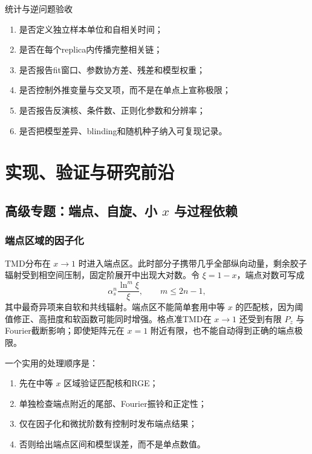 \documentclass[UTF8,12pt,a4paper,twoside,openany]{ctexbook}
\begin{document}
\begin{checkpointbox}{统计与逆问题验收}
\begin{enumerate}
  \item 是否定义独立样本单位和自相关时间；
  \item 是否在每个replica内传播完整相关链；
  \item 是否报告fit窗口、参数协方差、残差和模型权重；
  \item 是否控制外推变量与交叉项，而不是在单点上宣称极限；
  \item 是否报告反演核、条件数、正则化参数和分辨率；
  \item 是否把模型差异、blinding和随机种子纳入可复现记录。
\end{enumerate}
\end{checkpointbox}

\clearpage


\clearpage
\part{实现、验证与研究前沿}
\chapter{\texorpdfstring{高级专题：端点、自旋、小 \(x\) 与过程依赖}{高级专题：端点、自旋、小 x 与过程依赖}}
\label{sec:advanced-topics}

\section{端点区域的因子化}

TMD分布在 \(x\to1\) 时进入端点区。此时部分子携带几乎全部纵向动量，剩余胶子辐射受到相空间压制，固定阶展开中出现大对数。令 \(\xi=1-x\)，端点对数可写成
\begin{equation}
  \alpha_s^n\frac{\ln^m\xi}{\xi},
  \qquad m\le2n-1,
  \label{eq:endpoint-logs}
\end{equation}
其中最奇异项来自软和共线辐射。端点区不能简单套用中等 \(x\) 的匹配核，因为阈值修正、高扭度和软函数可能同时增强。格点准TMD在 \(x\to1\) 还受到有限 \(P_z\) 与 Fourier截断影响；即使矩阵元在 \(x=1\) 附近有限，也不能自动得到正确的端点极限。

一个实用的处理顺序是：
\begin{enumerate}
  \item 先在中等 \(x\) 区域验证匹配核和RGE；
  \item 单独检查端点附近的尾部、Fourier振铃和正定性；
  \item 仅在因子化和微扰阶数有控制时发布端点结果；
  \item 否则给出端点区间和模型误差，而不是单点数值。
\end{enumerate}
\end{document}
